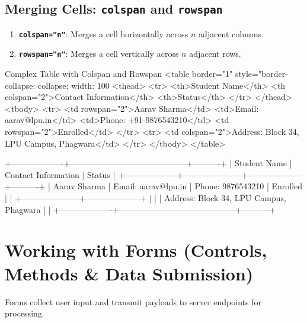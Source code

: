 \subsection{Merging Cells: \texttt{colspan} and \texttt{rowspan}}
\begin{enumerate}[leftmargin=1.5em]
    \item \textbf{\texttt{colspan="n"}}: Merges a cell horizontally across $n$ adjacent columns.
    \item \textbf{\texttt{rowspan="n"}}: Merges a cell vertically across $n$ adjacent rows.
\end{enumerate}

\begin{htmlcode}{Complex Table with Colspan and Rowspan}
<table border="1" style="border-collapse: collapse; width: 100%
    <thead>
        <tr>
            <th>Student Name</th>
            <th colspan="2">Contact Information</th>
            <th>Status</th>
        </tr>
    </thead>
    <tbody>
        <tr>
            <td rowspan="2">Aarav Sharma</td>
            <td>Email: aarav@lpu.in</td>
            <td>Phone: +91-9876543210</td>
            <td rowspan="2">Enrolled</td>
        </tr>
        <tr>
            <td colspan="2">Address: Block 34, LPU Campus, Phagwara</td>
        </tr>
    </tbody>
</table>
\end{htmlcode}

\begin{outputbox}
+-------------------+------------------------------------------+----------+
| Student Name      | Contact Information                      | Status   |
+-------------------+---------------------+--------------------+----------+
| Aarav Sharma      | Email: aarav@lpu.in | Phone: 9876543210  | Enrolled |
|                   +---------------------+--------------------+          |
|                   | Address: Block 34, LPU Campus, Phagwara  |          |
+-------------------+------------------------------------------+----------+
\end{outputbox}

\section{Working with Forms (Controls, Methods \& Data Submission)}

Forms collect user input and transmit payloads to server endpoints for processing.

